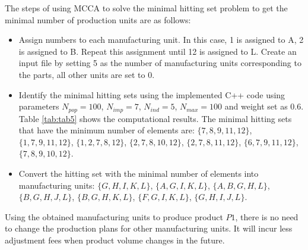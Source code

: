 The steps of using MCCA to solve the minimal hitting set problem to get the minimal number of production units are as follows:
\begin{itemize}
	\item Assign numbers to each manufacturing unit. In this case, 1 is assigned to A, 2 is assigned to B. Repeat this assignment until 12 is assigned to L. Create an input file by setting 5 as the number of manufacturing units corresponding to the parts, all other units are set to 0.
	\item Identify the minimal hitting sets using the implemented C++ code using parameters $N_{pop} = 100$, $N_{imp} = 7$, $N_{ind} = 5$, $N_{max} = 100$ and weight set as 0.6. Table \ref{tab:tab5} shows the computational results.
	The minimal hitting sets that have the minimum number of elements are: $\{7,8,9,11,12\}$,  $\{1,7,9,11,12\}$, $\{1,2,7,8,12\}$, $\{2,7,8,10,12\}$, $\{2,7,8,11,12\}$, $\{6,7,9,11,12\}$, $\{7,8,9,10,12\}$.
	\item Convert the hitting set with the minimal number of elements into manufacturing units: $\{G,H,I,K,L\}$, $\{A,G,I,K,L\}$, $\{A,B,G,H,L\}$, $\{B,G,H,J,L\}$, $\{B,G,H,K,L\}$, $\{F,G,I,K,L\}$, $\{G,H,I,J,L\}$.
\end{itemize}

Using the obtained manufacturing units to produce product $P1$, there is no need to change the production plans for other manufacturing units.
It will incur less adjustment fees when product volume changes in the future.


